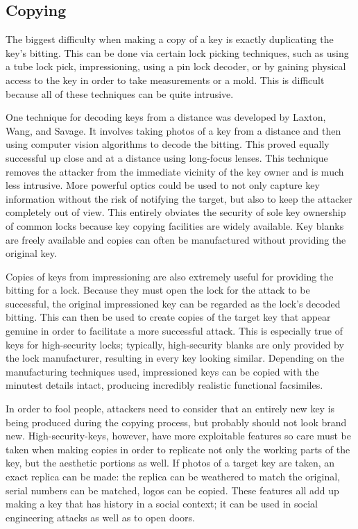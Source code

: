 \documentclass{acm_proc_article-sp}
\begin{document}
\subsection{Copying}
The biggest difficulty when making a copy of a key is exactly duplicating the key's bitting. This can be done via certain lock picking techniques, such as using a tube lock pick, impressioning, using a pin lock decoder, or by gaining physical access to the key in order to take measurements or a mold. This is difficult because all of these techniques can be quite intrusive.

One technique for decoding keys from a distance was developed by Laxton, Wang, and Savage. It involves taking photos of a key from a distance and then using computer vision algorithms to decode the bitting. This proved equally successful up close and at a distance using long-focus lenses. This technique removes the attacker from the immediate vicinity of the key owner and is much less intrusive. More powerful optics could be used to not only capture key information without the risk of notifying the target, but also to keep the attacker completely out of view. This entirely obviates the security of sole key ownership of common locks because key copying facilities are widely available. Key blanks are freely available and copies can often be manufactured without providing the original key.

Copies of keys from impressioning are also extremely useful for providing the bitting for a lock. Because they must open the lock for the attack to be successful, the original impressioned key can be regarded as the lock's decoded bitting. This can then be used to create copies of the target key that appear genuine in order to facilitate a more successful attack. This is especially true of keys for high-security locks; typically, high-security blanks are only provided by the lock manufacturer, resulting in every key looking similar. Depending on the manufacturing techniques used, impressioned keys can be copied with the minutest details intact, producing incredibly realistic functional facsimiles.

In order to fool people, attackers need to consider that an entirely new key is being produced during the copying process, but probably should not look brand new. High-security-keys, however, have more exploitable features so care must be taken when making copies in order to replicate not only the working parts of the key, but the aesthetic portions as well. If photos of a target key are taken, an exact replica can be made: the replica can be weathered to match the original, serial numbers can be matched, logos can be copied. These features all add up making a key that has history in a social context; it can be used in social engineering attacks as well as to open doors.
\end{document}
